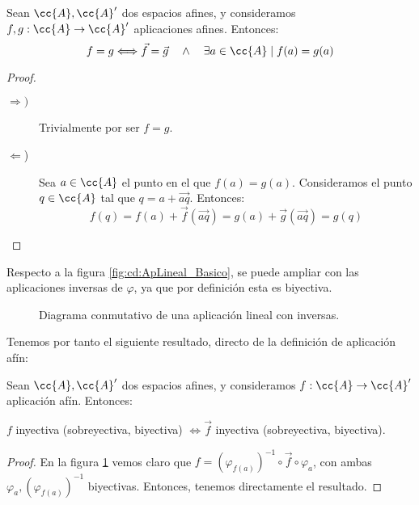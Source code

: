 \begin{teo}\label{teo:UnicidadLinealAsociada}
    Sean $\cc{A},\cc{A}'$ dos espacios afines, y consideramos $f,g:\cc{A}\to \cc{A}'$ aplicaciones afines. Entonces:
    \begin{equation*}
        f=g \Longleftrightarrow
         \vec{f}=\vec{g}
         \quad \land \quad
         \exists a\in \cc{A} \mid f(a)=g(a)
    \end{equation*}
\end{teo}
\begin{proof}\
    \begin{description}
        \item[$\Longrightarrow)$] Trivialmente por ser $f=g$.
        \item[$\Longleftarrow$)] Sea $a\in \cc{A}$ el punto en el que $f(a)=g(a)$. Consideramos el punto $q\in \cc{A}$ tal que $q=a+\vec{aq}$. Entonces:
        \begin{equation*}
            f(q) = f(a)+\vec{f}(\vec{aq}) = g(a) + \vec{g}(\vec{aq}) = g(q)
        \end{equation*}
    \end{description}
\end{proof}


Respecto a la figura \ref{fig:cd:ApLineal_Basico}, se puede ampliar con las aplicaciones inversas de $\varphi$, ya que por definición esta es biyectiva. 
\shorthandoff{"} %
\begin{figure}[H]
    \centering
    \caption{Diagrama conmutativo de una aplicación lineal con inversas.}
    \label{fig:cd:ApLineal_Inv}
\end{figure}
Tenemos por tanto el siguiente resultado, directo de la definición de aplicación afín:
\begin{prop}
    Sean $\cc{A},\cc{A}'$ dos espacios afines, y consideramos $f:\cc{A}\to \cc{A}'$ aplicación afín. Entonces:
    \begin{center}
        $f$ inyectiva (sobreyectiva, biyectiva) $\Longleftrightarrow  \vec{f}$ inyectiva (sobreyectiva, biyectiva).
    \end{center}
\end{prop}
\begin{proof}
    En la figura \ref{fig:cd:ApLineal_Inv} vemos claro que $f=(\varphi_{f(a)})^{-1}\circ \vec{f}\circ \varphi_a$, con ambas $\varphi_a, (\varphi_{f(a)})^{-1}$ biyectivas. Entonces, tenemos directamente el resultado.
\end{proof}

